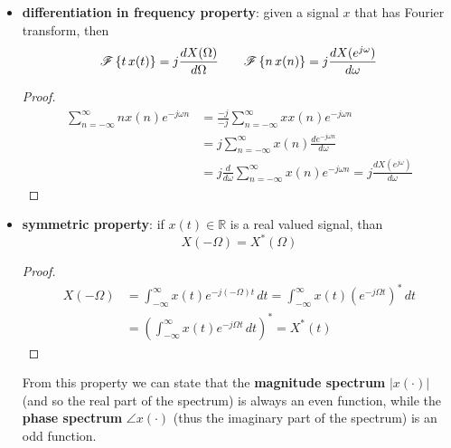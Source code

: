 \begin{itemize}
		\item \textbf{differentiation in frequency property}: given a signal $x$ that has Fourier transform, then
		\[\mathscr{F}\left\{ t\, x(t) \right\} = j \frac{d X(\Omega)}{d\Omega} \qquad \mathscr{F}\left\{ n \, x(n) \right\} = j \frac{dX(e^{j\omega})}{d\omega} \]
		
		\begin{proof}
		\begin{align*}
			\sum_{n=-\infty}^\infty n x(n) e^{-j\omega n} & = \frac{-j}{-j}\sum_{n=-\infty}^\infty x x(n) e^{-j\omega n} \\
			& = j \sum_{n=-\infty}^\infty x(n) \frac{de^{-j\omega n}}{d\omega} \\
			& = j \frac{d}{d\omega}\sum_{n=-\infty}^\infty x(n) e^{-j\omega n} = j \frac{dX(e^{j\omega})}{d\omega}
		\end{align*}
		\end{proof}
		
		\item \textbf{symmetric property}: if $x(t)\in \mathds R$ is a real valued signal, than
		\[ X(-\Omega) = X^*(\Omega) \]
		\begin{proof}
		\begin{align*}
			X(-\Omega) & = \int_{-\infty}^\infty x(t) e^{-j (-\Omega) t} \, dt = \int_{-\infty}^\infty x(t) \left(e^{-j\Omega t}\right)^* \, dt \\ 
			& = \left( \int_{-\infty}^\infty x(t) e^{-j\Omega t} \, dt\right)^* = X^*(t)
		\end{align*}
		\end{proof}
		From this property we can state that the \textbf{magnitude spectrum} $|x(\cdot)|$ (and so the real part of the spectrum) is always an even function, while the \textbf{phase spectrum} $\angle x(\cdot)$ (thus the imaginary part of the spectrum) is an odd function.
		
	\end{itemize}
	
	
	
	
	
	
	
	
	
	
	
	
	